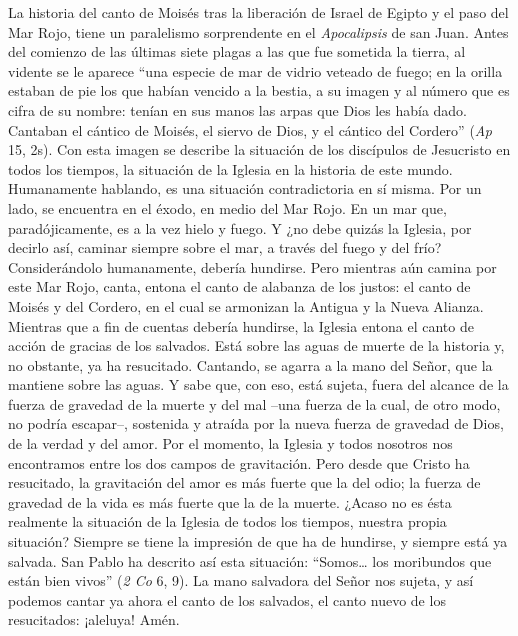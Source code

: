			\begin{body}La historia del canto de Moisés tras la liberación de Israel de Egipto y el paso del Mar Rojo, tiene un paralelismo sorprendente en el \textit{Apocalipsis} de san Juan. Antes del comienzo de las últimas siete plagas a las que fue sometida la tierra, al vidente se le aparece “una especie de mar de vidrio veteado de fuego; en la orilla estaban de pie los que habían vencido a la bestia, a su imagen y al número que es cifra de su nombre: tenían en sus manos las arpas que Dios les había dado. Cantaban el cántico de Moisés, el siervo de Dios, y el cántico del Cordero” (\textit{Ap }15, 2s). Con esta imagen se describe la situación de los discípulos de Jesucristo en todos los tiempos, la situación de la Iglesia en la historia de este mundo. Humanamente hablando, es una situación contradictoria en sí misma. Por un lado, se encuentra en el éxodo, en medio del Mar Rojo. En un mar que, paradójicamente, es a la vez hielo y fuego. Y ¿no debe quizás la Iglesia, por decirlo así, caminar siempre sobre el mar, a través del fuego y del frío? Considerándolo humanamente, debería hundirse. Pero mientras aún camina por este Mar Rojo, canta, entona el canto de alabanza de los justos: el canto de Moisés y del Cordero, en el cual se armonizan la Antigua y la Nueva Alianza. Mientras que a fin de cuentas debería hundirse, la Iglesia entona el canto de acción de gracias de los salvados. Está sobre las aguas de muerte de la historia y, no obstante, ya ha resucitado. Cantando, se agarra a la mano del Señor, que la mantiene sobre las aguas. Y sabe que, con eso, está sujeta, fuera del alcance de la fuerza de gravedad de la muerte y del mal –una fuerza de la cual, de otro modo, no podría escapar–, sostenida y atraída por la nueva fuerza de gravedad de Dios, de la verdad y del amor. Por el momento, la Iglesia y todos nosotros nos encontramos entre los dos campos de gravitación. Pero desde que Cristo ha resucitado, la gravitación del amor es más fuerte que la del odio; la fuerza de gravedad de la vida es más fuerte que la de la muerte. ¿Acaso no es ésta realmente la situación de la Iglesia de todos los tiempos, nuestra propia situación? Siempre se tiene la impresión de que ha de hundirse, y siempre está ya salvada. San Pablo ha descrito así esta situación: “Somos… los moribundos que están bien vivos” (\textit{2 Co} 6, 9). La mano salvadora del Señor nos sujeta, y así podemos cantar ya ahora el canto de los salvados, el canto nuevo de los resucitados: ¡aleluya! Amén.\end{body}
			
